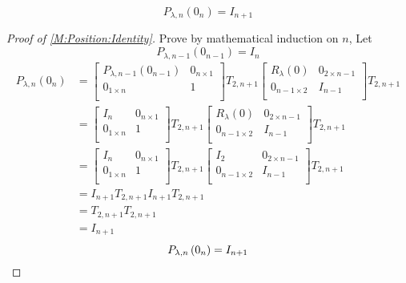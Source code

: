 \documentclass[../methodology.tex]{subfiles}
\begin{document}
\begin{corollary}\label{M:Position:Identity}
    \[
        P_{\lambda,n}
        \left(0_{n}\right)
        =
        I_{n+1}
    \]
\end{corollary}
\begin{proof}[Proof of \cref{M:Position:Identity}]
    Prove by mathematical induction on \(n\),
    Let
    \begin{equation}\label{M:Position:Set:Identity:Proof:Induction}
        P_{\lambda,n-1}\left(0_{n-1}\right)=I_n
    \end{equation}
    \begin{align*}
        P_{\lambda, n}\left(0_{n}\right)
         & =
        \begin{bmatrix}
            P_{\lambda,n-1}\left(0_{n-1}\right) & 0_{n\times 1} \\
            0_{1\times n}                       & 1             \\
        \end{bmatrix}
        T_{2, n+1}
        \begin{bmatrix}
            R_{\lambda}\left(0\right) & 0_{{2}\times{n-1}} \\
            0_{{n-1}\times{2}}        & {I}_{n-1}          \\
        \end{bmatrix}
        T_{2, n+1} \\
         & =
        \begin{bmatrix}
            I_{n}         & 0_{n\times 1} \\
            0_{1\times n} & 1             \\
        \end{bmatrix}
        T_{2, n+1}
        \begin{bmatrix}
            R_{\lambda}\left(0\right) & 0_{{2}\times{n-1}} \\
            0_{{n-1}\times{2}}        & {I}_{n-1}          \\
        \end{bmatrix}
        T_{2, n+1} \\
         & =
        \begin{bmatrix}
            I_{n}         & 0_{n\times 1} \\
            0_{1\times n} & 1             \\
        \end{bmatrix}
        T_{2, n+1}
        \begin{bmatrix}
            I_{2}              & 0_{{2}\times{n-1}} \\
            0_{{n-1}\times{2}} & {I}_{n-1}          \\
        \end{bmatrix}
        T_{2, n+1} \\
         & =
        I_{n+1}
        T_{2, n+1}
        I_{n+1}
        T_{2, n+1} \\
         & =
        T_{2, n+1}
        T_{2, n+1} \\
         & =
        I_{n+1}
    \end{align*}
    \[
        P_{\lambda,n}
        \left(0_{n}\right)
        =
        I_{n+1}
        \qedhere
    \]
\end{proof}
\end{document}

